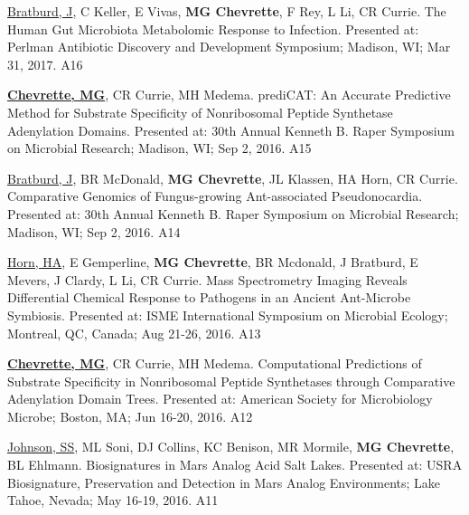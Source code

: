 \begin{cvpubs}

  \cvpub
    {\underline{Bratburd, J}, C Keller, E Vivas, \textbf{MG Chevrette}, F Rey, L Li, CR Currie.  The Human Gut Microbiota Metabolomic Response to Infection.  Presented at: Perlman Antibiotic Discovery and Development Symposium; Madison, WI; Mar 31, 2017.} %
    {A16} %

  \cvpub
    {\textbf{\underline{Chevrette, MG}}, CR Currie, MH Medema.  prediCAT: An Accurate Predictive Method for Substrate Specificity of Nonribosomal Peptide Synthetase Adenylation Domains.  Presented at: 30th Annual Kenneth B. Raper Symposium on Microbial Research; Madison, WI; Sep 2, 2016.} %
    {A15} %

  \cvpub
    {\underline{Bratburd, J}, BR McDonald, \textbf{MG Chevrette}, JL Klassen, HA Horn, CR Currie.  Comparative Genomics of Fungus-growing Ant-associated Pseudonocardia.  Presented at: 30th Annual Kenneth B. Raper Symposium on Microbial Research; Madison, WI; Sep 2, 2016.} %
    {A14} %
    
  \cvpub
    {\underline{Horn, HA}, E Gemperline, \textbf{MG Chevrette}, BR Mcdonald, J Bratburd, E Mevers, J Clardy, L Li, CR Currie.  Mass Spectrometry Imaging Reveals Differential Chemical Response to Pathogens in an Ancient Ant-Microbe Symbiosis.  Presented at: ISME International Symposium on Microbial Ecology; Montreal, QC, Canada; Aug 21-26, 2016.} %
    {A13} %


  \cvpub
    {\textbf{\underline{Chevrette, MG}}, CR Currie, MH Medema.  Computational Predictions of Substrate Specificity in Nonribosomal Peptide Synthetases through Comparative Adenylation Domain Trees.  Presented at: American Society for Microbiology Microbe; Boston, MA; Jun 16-20, 2016.} %
    {A12} %
    
  \cvpub
    {\underline{Johnson, SS}, ML Soni, DJ Collins, KC Benison, MR Mormile, \textbf{MG Chevrette}, BL Ehlmann.  Biosignatures in Mars Analog Acid Salt Lakes.  Presented at: USRA Biosignature, Preservation and Detection in Mars Analog Environments; Lake Tahoe, Nevada; May 16-19, 2016.} %
    {A11} %


\end{cvpubs}
